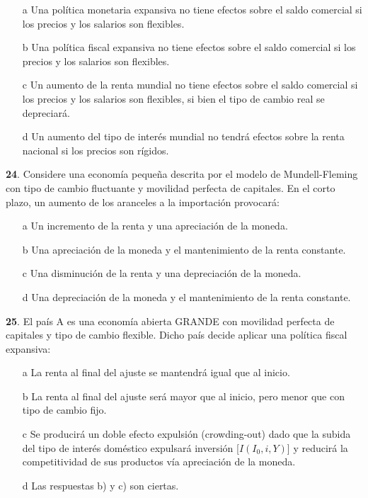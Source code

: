 \documentclass{nuevotema}
\begin{document}
\begin{itemize}
	\item[a] Una política monetaria expansiva no tiene efectos sobre el saldo comercial si los precios y los salarios son flexibles.
	\item[b] Una política fiscal expansiva no tiene efectos sobre el saldo comercial si los precios y los salarios son flexibles.
	\item[c] Un aumento de la renta mundial no tiene efectos sobre el saldo comercial si los precios y los salarios son flexibles, si bien el tipo de cambio real se depreciará.
	\item[d] Un aumento del tipo de interés mundial no tendrá efectos sobre la renta nacional si los precios son rígidos.
\end{itemize}


\textbf{24}. Considere una economía pequeña descrita por el modelo de Mundell-Fleming con tipo de cambio fluctuante y movilidad perfecta de capitales. En el corto plazo, un aumento de los aranceles a la importación provocará:

\begin{enumerate}
	\item[a] Un incremento de la renta y una apreciación de la moneda.
	\item[b] Una apreciación de la moneda y el mantenimiento de la renta constante.
	\item[c] Una disminución de la renta y una depreciación de la moneda.
	\item[d] Una depreciación de la moneda y el mantenimiento de la renta constante.
\end{enumerate}

\textbf{25}. El país A es una economía abierta GRANDE con movilidad perfecta de capitales y tipo de cambio flexible. Dicho país decide aplicar una política fiscal expansiva:
\begin{enumerate}
	\item[a] La renta al final del ajuste se mantendrá igual que al inicio.
	\item[b] La renta al final del ajuste será mayor que al inicio, pero menor que con tipo de cambio fijo.
	\item[c] Se producirá un doble efecto expulsión (crowding-out) dado que la subida del tipo de interés doméstico expulsará inversión [$I(I_0, i, Y)$] y reducirá la competitividad de sus productos vía apreciación de la moneda.
	\item[d] Las respuestas b) y c) son ciertas.
\end{enumerate}
\end{document}
